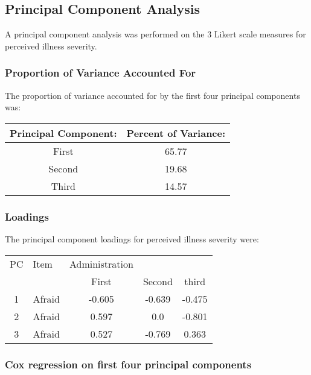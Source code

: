 \documentclass[12pt]{article}
\begin{document}
\subsection*{Principal Component Analysis}
A principal component analysis was performed on the 3 Likert scale measures for perceived illness severity.
\par\vspace{0.3 cm}
\subsubsection*{Proportion of Variance Accounted For}
The proportion of variance accounted for by the first four principal components was:
\par\vspace{0.3 cm}
\begin{tabular}{cc} Principal Component: & Percent of Variance:\\
\hline
First  & 65.77\\
Second & 19.68\\
Third  & 14.57
\end{tabular}
\par\vspace{0.3 cm}
\subsubsection*{Loadings}
The principal component loadings for perceived illness severity were:
\par\vspace{0.3 cm}\hspace{-2.0 cm}
\begin{tabular}{clccc}
PC & Item &Administration \\
   &      & First & Second & third\\
\hline
1 & \mbox{Afraid} & -0.605 & -0.639 & -0.475\\
\hline
2 & \mbox{Afraid} & 0.597 & 0.0 & -0.801\\
\hline
3 & \mbox{Afraid} & 0.527 & -0.769 & 0.363\\
\end{tabular}
\par\vspace{0.3 cm}
\subsubsection*{Cox regression on first four principal components}
\end{document}
